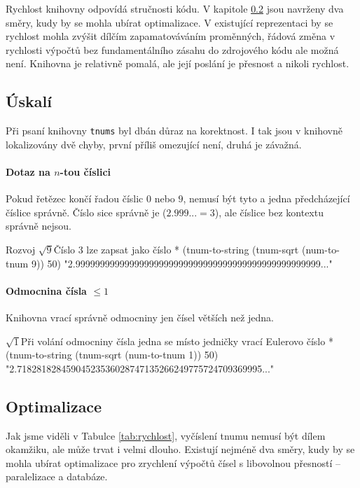 Rychlost knihovny odpovídá stručnosti kódu. V kapitole \ref{ssec:optimalizace} jsou navrženy dva směry, kudy by se mohla ubírat optimalizace. V existující reprezentaci 	by se rychlost mohla zvýšit dílčím zapamatováváním proměnných, řádová změna v rychlosti výpočtů bez fundamentálního zásahu do zdrojového kódu ale možná není. Knihovna je relativně pomalá, ale její poslání je přesnost a nikoli rychlost.

\subsection{Úskalí}
Při psaní knihovny \texttt{tnums} byl dbán důraz na korektnost. I tak jsou v knihovně lokalizovány dvě chyby, první příliš omezující není, druhá je závažná.

\paragraph{Dotaz na $n$-tou číslici} Pokud řetězec končí řadou číslic $0$ nebo $9$, nemusí být tyto a jedna předcházející číslice správně. Číslo sice správně je ($2.999...=3$), ale číslice bez kontextu správně nejsou.
\begin{lisptest}{Rozvoj $\sqrt{9}$}{Číslo 3 lze zapsat jako číslo \uv{$2.999\ldots$}}
* (tnum-to-string (tnum-sqrt (num-to-tnum 9)) 50)
"2.99999999999999999999999999999999999999999999999999..."
\end{lisptest}

\paragraph{Odmocnina čísla $\leq 1$}
Knihovna vrací správně odmocniny jen čísel větších než jedna.
\begin{lisptest}{$\sqrt{1}$}{Při volání odmocniny čísla jedna se místo jedničky vrací Eulerovo číslo}
* (tnum-to-string (tnum-sqrt (num-to-tnum 1)) 50)
"2.71828182845904523536028747135266249775724709369995..."
\end{lisptest}

\subsection{Optimalizace}\label{ssec:optimalizace}
Jak jsme viděli v Tabulce \ref{tab:rychlost}, vyčíslení tnumu nemusí být dílem okamžiku, ale může trvat i velmi dlouho. Existují nejméně dva směry, kudy by se mohla ubírat optimalizace pro zrychlení výpočtů čísel s libovolnou přesností -- paralelizace a databáze.

